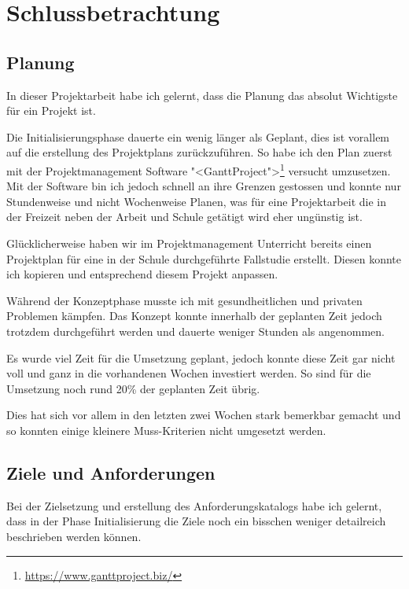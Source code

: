 \chapter{Schlussbetrachtung}

\label{ReportSchlussbetrachtung}

\section{Planung}

In dieser Projektarbeit habe ich gelernt, dass die Planung das absolut
Wichtigste für ein Projekt ist.

Die Initialisierungsphase dauerte ein wenig länger als Geplant, dies ist
vorallem auf die erstellung des Projektplans zurückzuführen. So habe ich
den Plan zuerst mit der Projektmanagement Software "<GanttProject">\footnote{\url{https://www.ganttproject.biz/}}
versucht umzusetzen. Mit der Software bin ich jedoch schnell an ihre
Grenzen gestossen und konnte nur Stundenweise und nicht Wochenweise
Planen, was für eine Projektarbeit die in der Freizeit neben der
Arbeit und Schule getätigt wird eher ungünstig ist.

Glücklicherweise haben wir im Projektmanagement Unterricht bereits einen
Projektplan für eine in der Schule durchgeführte Fallstudie erstellt.
Diesen konnte ich kopieren und entsprechend diesem Projekt anpassen.

Während der Konzeptphase musste ich mit gesundheitlichen und privaten
Problemen kämpfen. Das Konzept konnte innerhalb der geplanten Zeit jedoch
trotzdem durchgeführt werden und dauerte weniger Stunden als angenommen.

Es wurde viel Zeit für die Umsetzung geplant, jedoch konnte diese Zeit gar
nicht voll und ganz in die vorhandenen Wochen investiert werden. So sind
für die Umsetzung noch rund 20\% der geplanten Zeit übrig.

Dies hat sich vor allem in den letzten zwei Wochen stark bemerkbar gemacht und
so konnten einige kleinere Muss-Kriterien nicht umgesetzt werden.

\section{Ziele und Anforderungen}

Bei der Zielsetzung und erstellung des Anforderungskatalogs habe ich gelernt,
dass in der Phase Initialisierung die Ziele noch ein bisschen weniger
detailreich beschrieben werden können.

